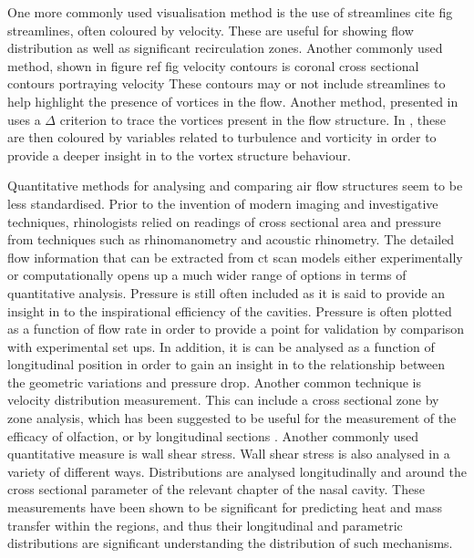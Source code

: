 One more commonly used visualisation method is the use of streamlines cite fig streamlines, often coloured by velocity\cite{Wen2008, Zhu2011, Garcia2007}. These are useful for showing flow distribution as well as significant recirculation zones\cite{Lintermann2013, Xi2014}. Another commonly used method, shown in figure ref fig velocity contours is coronal cross sectional contours portraying velocity These contours may or not include streamlines to help highlight the presence of vortices in the flow\cite{Wen2008}. Another method, presented in \cite{Lintermann2013} uses a $\Delta $ criterion to trace the vortices present in the flow structure. In \cite{Lintermann2013}, these are then coloured by variables related to turbulence and vorticity in order to provide a deeper insight in to the vortex structure behaviour.

Quantitative methods for analysing and comparing air flow structures seem to be less standardised. Prior to the invention of modern imaging and investigative techniques, rhinologists relied on readings of cross sectional area and pressure from techniques such as rhinomanometry and acoustic rhinometry\cite{Doorly2008c}. The detailed flow information that can be extracted from ct scan models either experimentally or computationally opens up a much wider range of options in terms of quantitative analysis. Pressure is still often included as it is said to provide an insight in to the inspirational efficiency of the cavities\cite{Lintermann2013}. Pressure is often plotted as a function of flow rate in order to provide a point for validation by comparison with experimental set ups\cite{Wen2008, Inthavong2014}. In addition, it is can be analysed as a function of longitudinal position in order to gain an insight in to the relationship between the geometric variations and pressure drop\cite{Lintermann2013}. Another common technique is velocity distribution measurement\cite{Keyhani1995, Zhu2011, Lintermann2013}. This can include a cross sectional zone by zone analysis\cite{Keyhani1995, Zhu2011}, which has been suggested to be useful for the measurement of the efficacy of olfaction\cite{Zhu2011}, or by longitudinal sections\cite{Lintermann2013,Taylor2010} . Another commonly used quantitative measure is wall shear stress. Wall shear stress is also analysed in a variety of different ways. Distributions are analysed longitudinally\cite{Wen2008} and around the cross sectional parameter of the relevant chapter of the nasal cavity\cite{Burgos2014}. These measurements have been shown to be significant for predicting heat and mass transfer within the regions\cite{Taylor2010}, and thus their longitudinal and parametric distributions are significant understanding the distribution of such mechanisms.

